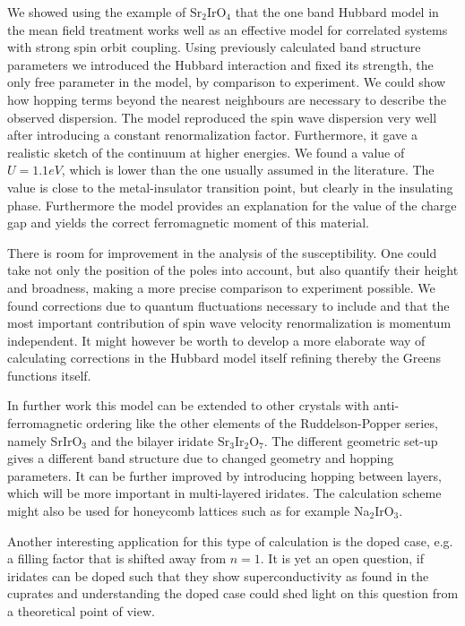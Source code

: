 We showed using the example of Sr$_2$IrO$_4$ that the one band Hubbard model in the mean field treatment works well as an effective model
for correlated systems with strong spin orbit coupling. 
Using previously calculated band structure parameters we introduced the Hubbard interaction and fixed its strength, the only free parameter in the model, by comparison to experiment. 
We could show how hopping terms beyond the nearest neighbours are necessary to describe the observed dispersion. 
The model reproduced the spin wave dispersion very well after introducing a constant renormalization factor. 
Furthermore, it gave a realistic sketch of the continuum at higher energies.
We found a value of $U=1.1eV$, which is lower than the one usually assumed in the literature.
The value is close to the metal-insulator transition point, but clearly in the insulating phase.
Furthermore the model provides an explanation for the value of the charge gap and yields the correct ferromagnetic moment of this material.


There is room for improvement in the analysis of the susceptibility. 
One could take not only the position of the poles into account, but also quantify their height and broadness, making a more precise comparison to experiment possible. 
We found corrections due to quantum fluctuations necessary to include and that the most important contribution of spin wave velocity renormalization is momentum independent. 
It might however be worth to develop a more elaborate way of calculating corrections in the Hubbard model itself refining thereby the Greens functions itself. 

In further work this model can be extended to other crystals with anti-ferromagnetic ordering
like the other elements of the Ruddelson-Popper series, namely SrIrO$_3$ and the bilayer iridate Sr$_3$Ir$_2$O$_7$.
The different geometric set-up gives a different band structure due to changed geometry and hopping parameters. 
It can be further improved by introducing hopping between layers, which will be more important in multi-layered iridates. 
The calculation scheme might also be used for honeycomb lattices such as for example Na$_2$IrO$_3$.

Another interesting application for this type of calculation is the doped case, e.g. a filling factor that is shifted away from $n=1$. 
It is yet an open question, if iridates can be doped such that they show superconductivity as found in the cuprates and understanding the 
doped case could shed light on this question from a theoretical point of view.





